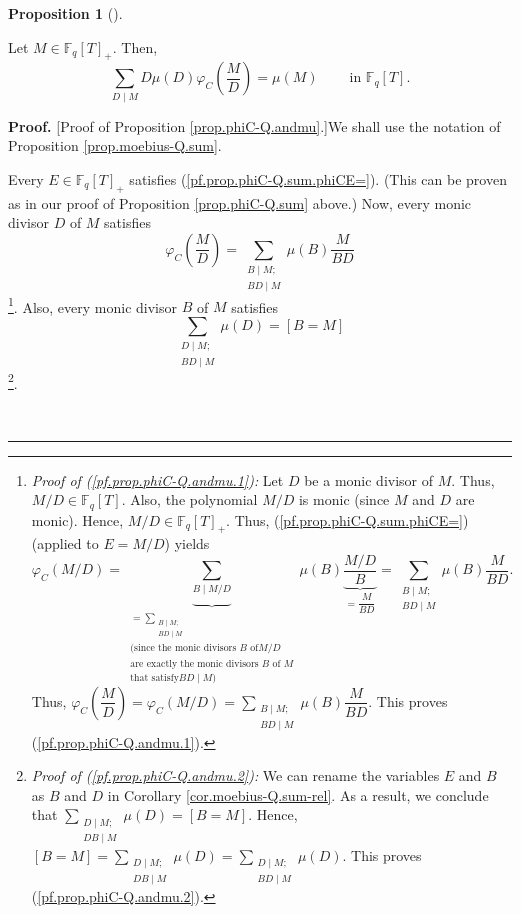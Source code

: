 \documentclass[numbers=enddot,12pt,final,onecolumn,notitlepage]{scrartcl}%
\theoremstyle{definition}
\newtheorem{prop}[theo]{Proposition}
\newenvironment{proposition}[1][]
{\begin{prop}[#1]\begin{leftbar}}
{\end{leftbar}\end{prop}}
\newenvironment{proof}[1][Proof]{\noindent\textbf{#1.} }{\ \rule{0.5em}{0.5em}}
\let\sumnonlimits\sum
\renewcommand{\sum}{\sumnonlimits\limits}
\begin{document}
\begin{proposition}
\label{prop.phiC-Q.andmu}Let $M\in\mathbb{F}_{q}\left[  T\right]  _{+}$. Then,%
\[
\sum_{D\mid M}D\mu\left(  D\right)  \varphi_{C}\left(  \dfrac{M}{D}\right)
=\mu\left(  M\right)  \ \ \ \ \ \ \ \ \ \ \text{in }\mathbb{F}_{q}\left[
T\right]  .
\]

\end{proposition}

\begin{proof}
[Proof of Proposition \ref{prop.phiC-Q.andmu}.]We shall use the notation of
Proposition \ref{prop.moebius-Q.sum}.

Every $E\in\mathbb{F}_{q}\left[  T\right]  _{+}$ satisfies
(\ref{pf.prop.phiC-Q.sum.phiCE=}). (This can be proven as in our proof of
Proposition \ref{prop.phiC-Q.sum} above.) Now, every monic divisor $D$ of $M$
satisfies%
\begin{equation}
\varphi_{C}\left(  \dfrac{M}{D}\right)  =\sum_{\substack{B\mid M;\\BD\mid
M}}\mu\left(  B\right)  \dfrac{M}{BD} \label{pf.prop.phiC-Q.andmu.1}%
\end{equation}
\footnote{\textit{Proof of (\ref{pf.prop.phiC-Q.andmu.1}):} Let $D$ be a monic
divisor of $M$. Thus, $M/D\in\mathbb{F}_{q}\left[  T\right]  $. Also, the
polynomial $M/D$ is monic (since $M$ and $D$ are monic). Hence, $M/D\in
\mathbb{F}_{q}\left[  T\right]  _{+}$. Thus, (\ref{pf.prop.phiC-Q.sum.phiCE=})
(applied to $E=M/D$) yields%
\[
\varphi_{C}\left(  M/D\right)  =\underbrace{\sum_{B\mid M/D}}_{\substack{=\sum
_{\substack{B\mid M;\\BD\mid M}}\\\text{(since the monic divisors }B\text{ of
}M/D\\\text{are exactly the monic divisors }B\text{ of }M\\\text{that satisfy
}BD\mid M\text{)}}}\mu\left(  B\right)  \underbrace{\dfrac{M/D}{B}}%
_{=\dfrac{M}{BD}}=\sum_{\substack{B\mid M;\\BD\mid M}}\mu\left(  B\right)
\dfrac{M}{BD}.
\]
Thus, $\varphi_{C}\left(  \dfrac{M}{D}\right)  =\varphi_{C}\left(  M/D\right)
=\sum_{\substack{B\mid M;\\BD\mid M}}\mu\left(  B\right)  \dfrac{M}{BD}$. This
proves (\ref{pf.prop.phiC-Q.andmu.1}).}. Also, every monic divisor $B$ of $M$
satisfies%
\begin{equation}
\sum_{\substack{D\mid M;\\BD\mid M}}\mu\left(  D\right)  =\left[  B=M\right]
\label{pf.prop.phiC-Q.andmu.2}%
\end{equation}
\footnote{\textit{Proof of (\ref{pf.prop.phiC-Q.andmu.2}):} We can rename the
variables $E$ and $B$ as $B$ and $D$ in Corollary \ref{cor.moebius-Q.sum-rel}.
As a result, we conclude that $\sum_{\substack{D\mid M;\\DB\mid M}}\mu\left(
D\right)  =\left[  B=M\right]  $. Hence, $\left[  B=M\right]  =\sum
_{\substack{D\mid M;\\DB\mid M}}\mu\left(  D\right)  =\sum_{\substack{D\mid
M;\\BD\mid M}}\mu\left(  D\right)  $. This proves
(\ref{pf.prop.phiC-Q.andmu.2}).}.


\end{proof}
\end{document}
